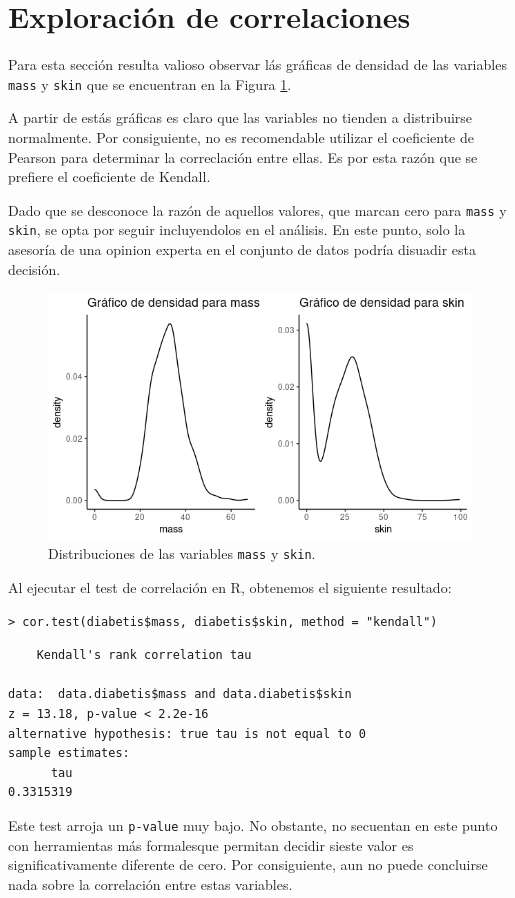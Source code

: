 \documentclass[11pt,letterpaper]{article}
\begin{document}
\section{Exploración de correlaciones}
Para esta sección resulta valioso observar lás gráficas de densidad de las variables {\tt mass} y {\tt skin} que se encuentran en la Figura \ref{fig:figure-03}.

A partir de estás gráficas es claro que las variables no tienden a distribuirse normalmente. Por consiguiente, no es recomendable utilizar el coeficiente de Pearson para determinar la correclación entre ellas. Es por esta razón que se prefiere el coeficiente de Kendall.

Dado que se desconoce la razón de aquellos valores, que marcan cero para {\tt mass} y {\tt skin}, se opta por seguir incluyendolos en el análisis. En este punto, solo la asesoría de una opinion experta en el conjunto de datos podría disuadir esta decisión.

\begin{figure}
\centering
\includegraphics[scale=0.6]{density_array.png}
\caption{Distribuciones de las variables {\tt mass} y {\tt skin}.}
\label{fig:figure-03} 
\end{figure}


Al ejecutar el test de correlación en R, obtenemos el siguiente resultado:

\begin{verbatim}
> cor.test(diabetis$mass, diabetis$skin, method = "kendall")
\end{verbatim}

\begin{verbatim}
	Kendall's rank correlation tau

data:  data.diabetis$mass and data.diabetis$skin
z = 13.18, p-value < 2.2e-16
alternative hypothesis: true tau is not equal to 0
sample estimates:
      tau 
0.3315319 
\end{verbatim}

Este test arroja un {\tt p-value} muy bajo. No obstante, no secuentan en este punto con herramientas más formalesque permitan decidir sieste valor es significativamente diferente de cero. Por consiguiente, aun no puede concluirse nada sobre la correlación entre estas variables.
\end{document}
